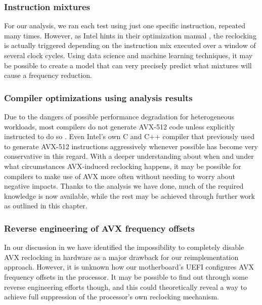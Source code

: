 \subsubsection{Instruction mixtures}
\label{sec:conclusion:futurework:mixtures}

For our analysis, we ran each test using just one specific instruction, repeated many times. However, as Intel hints in their optimization manual \cite{inteloptimizationmanual}, the reclocking is actually triggered depending on the instruction mix executed over a window of several clock cycles. Using data science and machine learning techniques, it may be possible to create a model that can very precisely predict what mixtures will cause a frequency reduction.

\subsubsection{Compiler optimizations using analysis results}
\label{sec:conclusion:futurework:compiler}

Due to the dangers of possible performance degradation for heterogeneous workloads, most compilers do not generate \gls{AVX-512} code unless explicitly instructed to do so \cite{lemire2018avx512}. Even Intel's own C and C++ compiler that previously used to generate \gls{AVX-512} instructions aggressively whenever possible has become very conservative in this regard. With a deeper understanding about when and under what circumstances \gls{AVX}-induced reclocking happens, it may be possible for compilers to make use of \gls{AVX} more often without needing to worry about negative impacts. Thanks to the analysis we have done, much of the required knowledge is now available, while the rest may be achieved through further work as outlined in this chapter.

\subsubsection{Reverse engineering of AVX frequency offsets}
\label{sec:conclusion:futurework:reversing}

In our discussion in  we have identified the impossibility to completely disable \gls{AVX} reclocking in hardware as a major drawback for our reimplementation approach. However, it is unknown how our motherboard's \gls{UEFI} configures \gls{AVX} frequency offsets in the processor. It may be possible to find out through some reverse engineering efforts though, and this could theoretically reveal a way to achieve full suppression of the processor's own reclocking mechanism.

